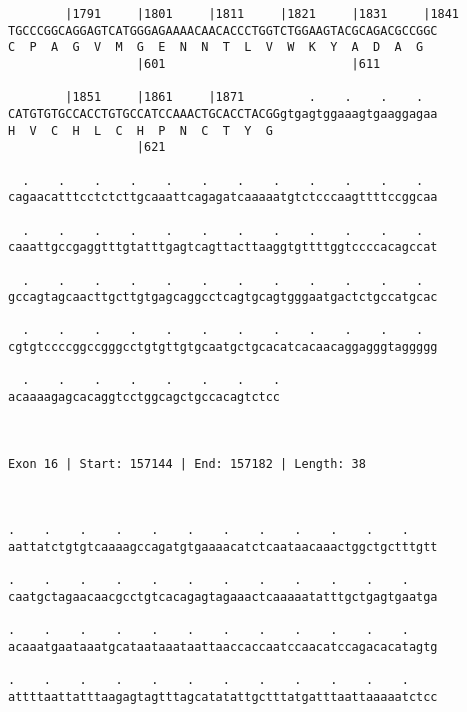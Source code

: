 \documentclass{article}
\begin{document}
\begin{Verbatim}
        |1791     |1801     |1811     |1821     |1831     |1841
TGCCCGGCAGGAGTCATGGGAGAAAACAACACCCTGGTCTGGAAGTACGCAGACGCCGGC
C  P  A  G  V  M  G  E  N  N  T  L  V  W  K  Y  A  D  A  G  
                  |601                          |611        
  
        |1851     |1861     |1871         .    .    .    .  
CATGTGTGCCACCTGTGCCATCCAAACTGCACCTACGGgtgagtggaaagtgaaggagaa
H  V  C  H  L  C  H  P  N  C  T  Y  G                       
                  |621                                      
  
  .    .    .    .    .    .    .    .    .    .    .    .  
cagaacatttcctctcttgcaaattcagagatcaaaaatgtctcccaagttttccggcaa
                                                            
  .    .    .    .    .    .    .    .    .    .    .    .  
caaattgccgaggtttgtatttgagtcagttacttaaggtgttttggtccccacagccat
                                                            
  .    .    .    .    .    .    .    .    .    .    .    .  
gccagtagcaacttgcttgtgagcaggcctcagtgcagtgggaatgactctgccatgcac
                                                            
  .    .    .    .    .    .    .    .    .    .    .    .  
cgtgtccccggccgggcctgtgttgtgcaatgctgcacatcacaacaggagggtaggggg
                                                            
  .    .    .    .    .    .    .    .
acaaaagagcacaggtcctggcagctgccacagtctcc
                                      
                                      
 
Exon 16 | Start: 157144 | End: 157182 | Length: 38



.    .    .    .    .    .    .    .    .    .    .    .    
aattatctgtgtcaaaagccagatgtgaaaacatctcaataacaaactggctgctttgtt
                                                            
.    .    .    .    .    .    .    .    .    .    .    .    
caatgctagaacaacgcctgtcacagagtagaaactcaaaaatatttgctgagtgaatga
                                                            
.    .    .    .    .    .    .    .    .    .    .    .    
acaaatgaataaatgcataataaataattaaccaccaatccaacatccagacacatagtg
                                                            
.    .    .    .    .    .    .    .    .    .    .    .    
attttaattatttaagagtagtttagcatatattgctttatgatttaattaaaaatctcc
                                                            

\end{Verbatim}
\end{document}
